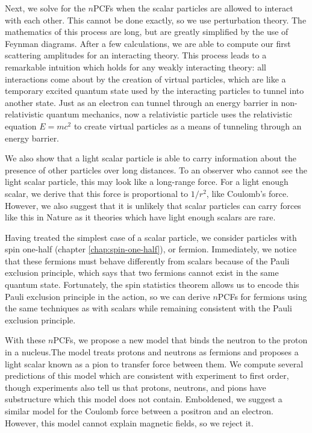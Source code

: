 Next, we solve for the $n$PCFs when the scalar particles are allowed to interact with each other. This cannot be done exactly, so we use perturbation theory. The mathematics of this process are long, but are greatly simplified by the use of Feynman diagrams. After a few calculations, we are able to compute our first scattering amplitudes for an interacting theory. This process leads to a remarkable intuition which holds for any weakly interacting theory: all interactions come about by the creation of virtual particles, which are like a temporary excited quantum state used by the interacting particles to tunnel into another state. Just as an electron can tunnel through an energy barrier in non-relativistic quantum mechanics, now a relativistic particle uses the relativistic equation $E=mc^2$ to create virtual particles as a means of tunneling through an energy barrier.

We also show that a light scalar particle is able to carry information about the presence of other particles over long distances. To an observer who cannot see the light scalar particle, this may look like a long-range force. For a light enough scalar, we derive that this force is proportional to $1/r^2$, like Coulomb's force. However, we also suggest that it is unlikely that scalar particles can carry forces like this in Nature as it theories which have light enough scalars are rare.

Having treated the simplest case of a scalar particle, we consider particles with spin one-half (chapter \ref{chap:spin-one-half}), or fermion. Immediately, we notice that these fermions must behave differently from scalars because of the Pauli exclusion principle, which says that two fermions cannot exist in the same quantum state. Fortunately, the spin statistics theorem allows us to encode this Pauli exclusion principle in the action, so we can derive $n$PCFs for fermions using the same techniques as with scalars while remaining consistent with the Pauli exclusion principle.

With these $n$PCFs, we propose a new model that binds the neutron to the proton in a nucleus.The model treats protons and neutrons as fermions and proposes a light scalar known as a pion to transfer force between them. We compute several predictions of this model which are consistent with experiment to first order, though experiments also tell us that protons, neutrons, and pions have substructure which this model does not contain. Emboldened, we suggest a similar model for the Coulomb force between a positron and an electron. However, this model cannot explain magnetic fields, so we reject it. 


